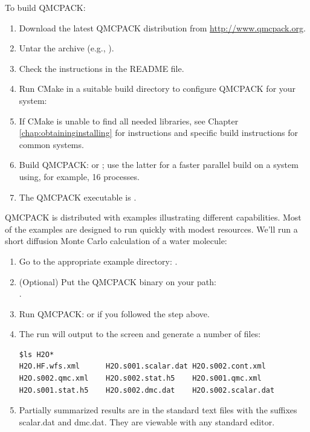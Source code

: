 To build QMCPACK:

\begin{enumerate}
\item Download the latest QMCPACK distribution from
  \url{http://www.qmcpack.org}.
\item Untar the archive (e.g., ).
\item Check the instructions in the README file.
\item Run CMake in a suitable build directory to configure QMCPACK for
  your system: 
\item If CMake is unable to find all needed libraries, see Chapter
  \ref{chap:obtaininginstalling} for instructions and specific build
  instructions for common systems.
\item Build QMCPACK:  or ; use the latter
  for a faster parallel build on a system using, for example, 16 processes.
\item The QMCPACK executable is .
\end{enumerate}

QMCPACK is distributed with examples illustrating different
capabilities. Most of the examples are designed to run quickly with
modest resources. We'll run a short diffusion Monte Carlo calculation
of a water molecule:

\begin{enumerate}
\item Go to the appropriate example directory: .
\item (Optional) Put the QMCPACK binary on your path:\\ .
\item Run QMCPACK:  or
   if you followed the step above.
\item The run will output to the screen and generate a number of files:
\begin{verbatim}
$ls H2O*
H2O.HF.wfs.xml      H2O.s001.scalar.dat H2O.s002.cont.xml
H2O.s002.qmc.xml    H2O.s002.stat.h5    H2O.s001.qmc.xml
H2O.s001.stat.h5    H2O.s002.dmc.dat    H2O.s002.scalar.dat
\end{verbatim}
\item Partially summarized results are in the standard text files with the
  suffixes scalar.dat and dmc.dat. They are viewable with any standard editor.
\end{enumerate}

